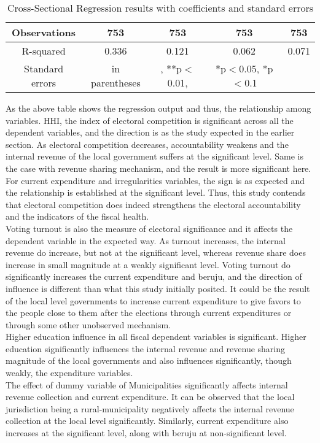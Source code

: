 \begin{table}[ht]
\begin{tabular}{|ccccc|}
Observations & 753 & 753 & 753 & 753 \\
\hline
R-squared &0.336 & 0.121 & 0.062 & 0.071 \\
\hline
\footnotesize Standard errors& \footnotesize in parentheses&, \footnotesize***p$<$0.01, &\footnotesize **p$<$0.05, *p$<$0.1\\
\end{tabular}
\caption{Cross-Sectional Regression results with coefficients and standard errors}
\label{tab:coefficients_with_se}
\end{table}
As the above table shows the regression output and thus, the relationship among variables. HHI, the index of electoral competition is significant across all the dependent variables, and the direction is as the study expected in the earlier section. As electoral competition decreases, accountability weakens and the internal revenue of the local government suffers at the significant level. Same is the case with revenue sharing mechanism, and the result is more significant here. For current expenditure and irregularities variables, the sign is as expected and the relationship is established at the significant level. Thus, this study contends that electoral competition does indeed strengthens the electoral accountability and the indicators of the fiscal health.\\
Voting turnout is also the measure of electoral significance and it affects the dependent variable in the expected way. As turnout increases, the internal revenue do increase, but not at the significant level, whereas revenue share does increase in small magnitude at a weakly significant level. Voting turnout do significantly increases the current expenditure and beruju, and the direction of influence is different than what this study initially posited. It could be the result of the local level governments to increase current expenditure to give favors to the people close to them after the elections through current expenditures or through some other unobserved mechanism.\\
Higher education influence in all fiscal dependent variables is significant. Higher education significantly influences the internal revenue and revenue sharing magnitude of the local governments and also influences significantly, though weakly, the expenditure variables.\\
The effect of dummy variable of Municipalities significantly affects internal revenue collection and current expenditure. It can be observed that the local jurisdiction being a rural-municipality negatively affects the internal revenue collection at the local level significantly. Similarly, current expenditure also increases at the significant level, along with beruju at non-significant level.
